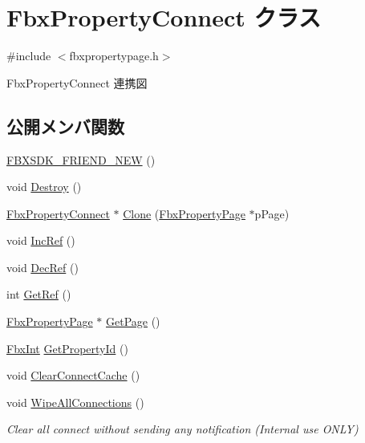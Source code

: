 \hypertarget{class_fbx_property_connect}{}\section{Fbx\+Property\+Connect クラス}
\label{class_fbx_property_connect}


{\ttfamily \#include $<$fbxpropertypage.\+h$>$}



Fbx\+Property\+Connect 連携図
\subsection*{公開メンバ関数}
\begin{DoxyCompactItemize}
\item 
\hyperlink{class_fbx_property_connect_ac857234b07a63fba9f3433a02c9217c7}{F\+B\+X\+S\+D\+K\+\_\+\+F\+R\+I\+E\+N\+D\+\_\+\+N\+EW} ()
\item 
void \hyperlink{class_fbx_property_connect_aed862bff6fa1cfb39b7f76cd52d4b8a1}{Destroy} ()
\item 
\hyperlink{class_fbx_property_connect}{Fbx\+Property\+Connect} $\ast$ \hyperlink{class_fbx_property_connect_aff713a2a67f9a1cfb0ecad7e548304ea}{Clone} (\hyperlink{class_fbx_property_page}{Fbx\+Property\+Page} $\ast$p\+Page)
\item 
void \hyperlink{class_fbx_property_connect_ad1c6573c7343eab1e833824f02be39e1}{Inc\+Ref} ()
\item 
void \hyperlink{class_fbx_property_connect_a2396c6fe707bc6f2f44cc70fdbe44761}{Dec\+Ref} ()
\item 
int \hyperlink{class_fbx_property_connect_a085658a0559ff68f4eb555f0d981e038}{Get\+Ref} ()
\item 
\hyperlink{class_fbx_property_page}{Fbx\+Property\+Page} $\ast$ \hyperlink{class_fbx_property_connect_a738445f2445642878f28886d95e107e9}{Get\+Page} ()
\item 
\hyperlink{fbxtypes_8h_a088fa96de3b0b3ea69f0f6afef525dfb}{Fbx\+Int} \hyperlink{class_fbx_property_connect_af2dd9a64ff4fa806d330d7f21eeb9dbf}{Get\+Property\+Id} ()
\item 
void \hyperlink{class_fbx_property_connect_a993c2baae886bb7259a5246ef2e791f3}{Clear\+Connect\+Cache} ()
\item 
void \hyperlink{class_fbx_property_connect_a56ae82d708c6c05c82a8e98d565f986b}{Wipe\+All\+Connections} ()
\begin{DoxyCompactList}\small\item\em Clear all connect without sending any notification (Internal use O\+N\+LY) \end{DoxyCompactList}\item 

\end{DoxyCompactItemize}
